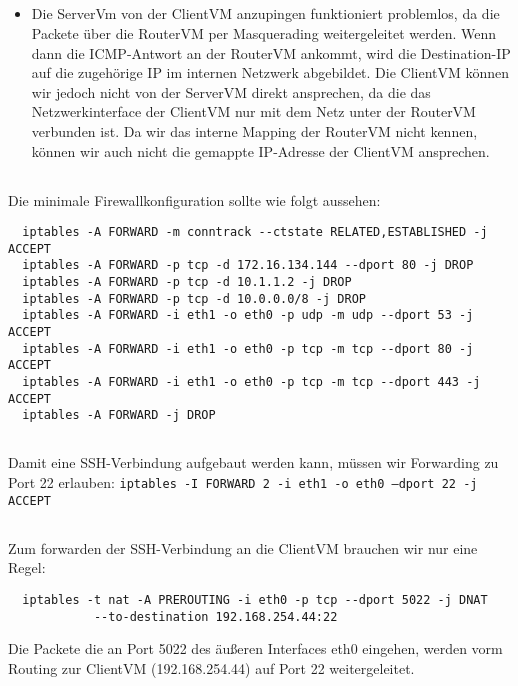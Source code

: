 \documentclass{scrartcl}
\begin{document}
\begin{enumerate}[\bfseries 1.]
	\subsection{}
	\label{sub:3.2}
	\begin{itemize}
		\item
		      Die ServerVm von der ClientVM anzupingen funktioniert problemlos,
		      da die Packete über die RouterVM per Masquerading weitergeleitet werden.
		      Wenn dann die ICMP-Antwort an der RouterVM ankommt, wird die Destination-IP
		      auf die zugehörige IP im internen Netzwerk abgebildet.
		      Die ClientVM können wir jedoch nicht von der ServerVM direkt ansprechen, da
		      die das Netzwerkinterface der ClientVM nur mit dem Netz unter der RouterVM
		      verbunden ist. Da wir das interne Mapping der RouterVM nicht kennen, können
		      wir auch nicht die gemappte IP-Adresse der ClientVM ansprechen.
	\end{itemize}

	\subsection{}
	\label{sub:3.3}
	Die minimale Firewallkonfiguration sollte wie folgt aussehen:
	\begin{lstlisting}
  iptables -A FORWARD -m conntrack --ctstate RELATED,ESTABLISHED -j ACCEPT
  iptables -A FORWARD -p tcp -d 172.16.134.144 --dport 80 -j DROP
  iptables -A FORWARD -p tcp -d 10.1.1.2 -j DROP
  iptables -A FORWARD -p tcp -d 10.0.0.0/8 -j DROP
  iptables -A FORWARD -i eth1 -o eth0 -p udp -m udp --dport 53 -j ACCEPT
  iptables -A FORWARD -i eth1 -o eth0 -p tcp -m tcp --dport 80 -j ACCEPT
  iptables -A FORWARD -i eth1 -o eth0 -p tcp -m tcp --dport 443 -j ACCEPT
  iptables -A FORWARD -j DROP
	\end{lstlisting}

	\subsection{}
	\label{sub:3.4}
	Damit eine SSH-Verbindung aufgebaut werden kann, müssen wir Forwarding zu Port
	22 erlauben: \texttt{iptables -I FORWARD 2 -i eth1 -o eth0 --dport 22 -j ACCEPT}

	\subsection{}
	\label{sub:3.5}
	Zum forwarden der SSH-Verbindung an die ClientVM brauchen wir nur eine Regel:
	\begin{lstlisting}
  iptables -t nat -A PREROUTING -i eth0 -p tcp --dport 5022 -j DNAT
            --to-destination 192.168.254.44:22
	\end{lstlisting}
	Die Packete die an Port 5022 des äußeren Interfaces eth0 eingehen, werden vorm
	Routing zur ClientVM (192.168.254.44) auf Port 22 weitergeleitet.


\end{enumerate}
\end{document}
